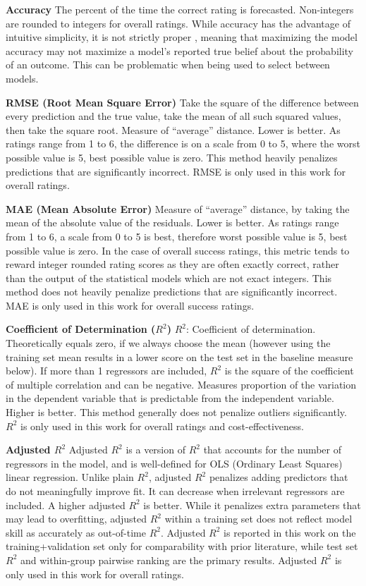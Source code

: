 \textbf{Accuracy}
The percent of the time the correct rating is forecasted. Non-integers are rounded to integers for overall ratings. While accuracy has the advantage of intuitive simplicity, it is not strictly proper \citep{gneitingStrictlyProperScoring2007}, meaning that maximizing the model accuracy may not maximize a model's reported true belief about the probability of an outcome. This can be problematic when being used to select between models.

\textbf{RMSE (Root Mean Square Error)}
Take the square of the difference between every prediction and the true value, take the mean of all such squared values, then take the square root. Measure of “average” distance. Lower is better. As ratings range from 1 to 6, the difference is on a scale from 0 to 5, where the worst possible value is 5, best possible value is zero. This method heavily penalizes predictions that are significantly incorrect. RMSE is only used in this work for overall ratings.

\textbf{MAE (Mean Absolute Error)}
Measure of “average” distance, by taking the mean of the absolute value of the residuals. Lower is better. As ratings range from 1 to 6, a scale from 0 to 5 is best, therefore worst possible value is 5, best possible value is zero. In the case of overall success ratings, this metric tends to reward integer rounded rating scores as they are often exactly correct, rather than the output of the statistical models which are not exact integers. This method does not heavily penalize predictions that are significantly incorrect. MAE is only used in this work for overall success ratings.

\textbf{Coefficient of Determination ($R^2$)}
$R^2$: Coefficient of determination. Theoretically equals zero, if we always choose the mean (however using the training set mean results in a lower score on the test set in the baseline measure below). If more than 1 regressors are included, $R^2$ is the square of the coefficient of multiple correlation and can be negative. Measures proportion of the variation in the dependent variable that is predictable from the independent variable. Higher is better. This method generally does not penalize outliers significantly. $R^2$ is only used in this work for overall ratings and cost-effectiveness.

\textbf{Adjusted $R^2$}
Adjusted $R^2$ is a version of $R^2$ that accounts for the number of regressors in the model, and is well-defined for OLS (Ordinary Least Squares) linear regression. Unlike plain $R^2$, adjusted $R^2$ penalizes adding predictors that do not meaningfully improve fit. It can decrease when irrelevant regressors are included. A higher adjusted $R^2$ is better. While it penalizes extra parameters that may lead to overfitting, adjusted $R^2$ within a training set does not reflect model skill as accurately as out-of-time $R^2$. Adjusted $R^2$ is reported in this work on the training+validation set only for comparability with prior literature, while test set $R^2$ and within-group pairwise ranking are the primary results. Adjusted $R^2$ is only used in this work for overall ratings.

